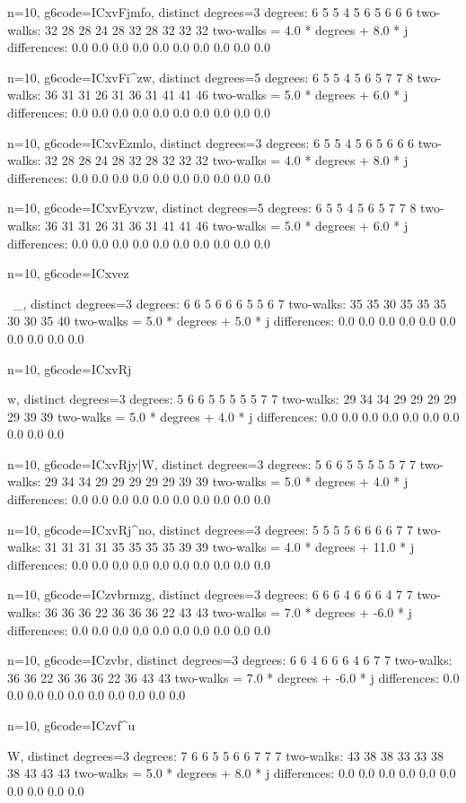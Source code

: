 {{{{{{{{{{{{n=10, g6code=ICxvFjmfo, distinct degrees=3
degrees: 6 5 5 4 5 6 5 6 6 6 
two-walks: 32 28 28 24 28 32 28 32 32 32 
two-walks = 4.0 * degrees + 8.0 * j
differences: 0.0 0.0 0.0 0.0 0.0 0.0 0.0 0.0 0.0 0.0 

n=10, g6code=ICxvFi^zw, distinct degrees=5
degrees: 6 5 5 4 5 6 5 7 7 8 
two-walks: 36 31 31 26 31 36 31 41 41 46 
two-walks = 5.0 * degrees + 6.0 * j
differences: 0.0 0.0 0.0 0.0 0.0 0.0 0.0 0.0 0.0 0.0 

n=10, g6code=ICxvEzmlo, distinct degrees=3
degrees: 6 5 5 4 5 6 5 6 6 6 
two-walks: 32 28 28 24 28 32 28 32 32 32 
two-walks = 4.0 * degrees + 8.0 * j
differences: 0.0 0.0 0.0 0.0 0.0 0.0 0.0 0.0 0.0 0.0 

n=10, g6code=ICxvEyvzw, distinct degrees=5
degrees: 6 5 5 4 5 6 5 7 7 8 
two-walks: 36 31 31 26 31 36 31 41 41 46 
two-walks = 5.0 * degrees + 6.0 * j
differences: 0.0 0.0 0.0 0.0 0.0 0.0 0.0 0.0 0.0 0.0 

n=10, g6code=ICxvez{~_, distinct degrees=3
degrees: 6 6 5 6 6 6 5 5 6 7 
two-walks: 35 35 30 35 35 35 30 30 35 40 
two-walks = 5.0 * degrees + 5.0 * j
differences: 0.0 0.0 0.0 0.0 0.0 0.0 0.0 0.0 0.0 0.0 

n=10, g6code=ICxvRj{{w, distinct degrees=3
degrees: 5 6 6 5 5 5 5 5 7 7 
two-walks: 29 34 34 29 29 29 29 29 39 39 
two-walks = 5.0 * degrees + 4.0 * j
differences: 0.0 0.0 0.0 0.0 0.0 0.0 0.0 0.0 0.0 0.0 

n=10, g6code=ICxvRjy|W, distinct degrees=3
degrees: 5 6 6 5 5 5 5 5 7 7 
two-walks: 29 34 34 29 29 29 29 29 39 39 
two-walks = 5.0 * degrees + 4.0 * j
differences: 0.0 0.0 0.0 0.0 0.0 0.0 0.0 0.0 0.0 0.0 

n=10, g6code=ICxvRj^no, distinct degrees=3
degrees: 5 5 5 5 6 6 6 6 7 7 
two-walks: 31 31 31 31 35 35 35 35 39 39 
two-walks = 4.0 * degrees + 11.0 * j
differences: 0.0 0.0 0.0 0.0 0.0 0.0 0.0 0.0 0.0 0.0 

n=10, g6code=ICzvbrmzg, distinct degrees=3
degrees: 6 6 6 4 6 6 6 4 7 7 
two-walks: 36 36 36 22 36 36 36 22 43 43 
two-walks = 7.0 * degrees + -6.0 * j
differences: 0.0 0.0 0.0 0.0 0.0 0.0 0.0 0.0 0.0 0.0 

n=10, g6code=ICzvbr\vW, distinct degrees=3
degrees: 6 6 4 6 6 6 4 6 7 7 
two-walks: 36 36 22 36 36 36 22 36 43 43 
two-walks = 7.0 * degrees + -6.0 * j
differences: 0.0 0.0 0.0 0.0 0.0 0.0 0.0 0.0 0.0 0.0 

n=10, g6code=ICzvf^u}W, distinct degrees=3
degrees: 7 6 6 5 5 6 6 7 7 7 
two-walks: 43 38 38 33 33 38 38 43 43 43 
two-walks = 5.0 * degrees + 8.0 * j
differences: 0.0 0.0 0.0 0.0 0.0 0.0 0.0 0.0 0.0 0.0 

}}}}}}}}}}}}}}
